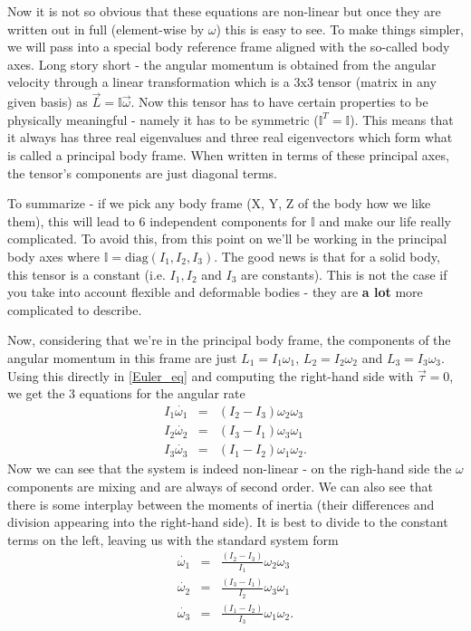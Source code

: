 \documentclass[a4paper]{article}
\begin{document}
	Now it is not so obvious that these equations are non-linear but once they are written out in full (element-wise by $\omega$) this is easy to see.
	To make things simpler, we will pass into a special body reference frame aligned with the so-called body axes.
	Long story short - the angular momentum is obtained from the angular velocity through a linear transformation which is a 3x3 tensor (matrix in any given basis) as $\vec{L} = \mathbb{I}\vec{\omega}$.
	Now this tensor has to have certain properties to be physically meaningful - namely it has to be symmetric ($\mathbb{I}^T = \mathbb{I}$).
	This means that it always has three real eigenvalues and three real eigenvectors which form what is called a principal body frame.
	When written in terms of these principal axes, the tensor's components are just diagonal terms.

	To summarize - if we pick any body frame (X, Y, Z of the body how we like them), this will lead to 6 independent components for $\mathbb{I}$ and make our life really complicated.
	To avoid this, from this point on we'll be working in the principal body axes where $\mathbb{I} = \mathrm{diag}( I_1 , I_2 , I_3 )$.
	The good news is that for a solid body, this tensor is a constant (i.e. $I_1, I_2$ and $I_3$ are constants).
	This is not the case if you take into account flexible and deformable bodies - they are \textbf{a lot} more complicated to describe.

	Now, considering that we're in the principal body frame, the components of the angular momentum in this frame are just $L_1 = I_1 \omega_1$, $L_2 = I_2 \omega_2$ and $L_3 = I_3 \omega_3$.
	Using this directly in \eqref{Euler_eq} and computing the right-hand side with $\vec{\tau} = 0$, we get the 3 equations for the angular rate
	\begin{eqnarray}
		I_1\dot{\omega_1} & = & ( I_2 - I_3 )\omega_2 \omega_3 \nonumber \\
		I_2\dot{\omega_2} & = & ( I_3 - I_1 )\omega_3 \omega_1 \\
		I_3\dot{\omega_3} & = & ( I_1 - I_2 )\omega_1 \omega_2. \nonumber
	\end{eqnarray} 
	Now we can see that the system is indeed non-linear - on the righ-hand side the $\omega$ components are mixing and are always of second order.
	We can also see that there is some interplay between the moments of inertia (their differences and division appearing into the right-hand side).
	It is best to divide to the constant terms on the left, leaving us with the standard system form 
	\begin{eqnarray}
		\dot{\omega_1} & = & \frac{( I_2 - I_3 )}{I_1}\omega_2 \omega_3 \nonumber \\
		\dot{\omega_2} & = & \frac{( I_3 - I_1 )}{I_2}\omega_3 \omega_1 \\ \label{Euler_full}
		\dot{\omega_3} & = & \frac{( I_1 - I_2 )}{I_3}\omega_1 \omega_2. \nonumber
	\end{eqnarray}
\end{document}
